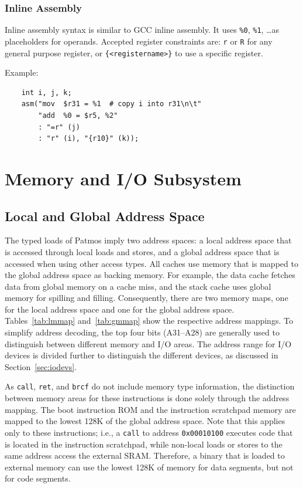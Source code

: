 \documentclass[a4paper,fontsize=10pt,twoside,DIV15,BCOR12mm,headinclude=true,footinclude=false,pagesize,bibtotoc]{scrbook}
\newcommand{\code}[1]{{\texttt{#1}}}
\begin{document}
\subsection{Inline Assembly}

Inline assembly syntax is similar to GCC inline assembly. It uses \texttt{\%0}, \texttt{\%1}, \ldots as placeholders
for operands. Accepted register constraints are: \texttt{r} or \texttt{R} for any general purpose register, or
\texttt{\{<registername>\}} to use a specific register.

Example:
\begin{verbatim}
    int i, j, k;
    asm("mov  $r31 = %1  # copy i into r31\n\t"
        "add  %0 = $r5, %2"
        : "=r" (j)
        : "r" (i), "{r10}" (k));
\end{verbatim}

\chapter{Memory and I/O Subsystem}
\label{chap:memsyst}

\section{Local and Global Address Space}

The typed loads of Patmos imply two address spaces: a local address
space that is accessed through local loads and stores, and a global
address space that is accessed when using other access types. All
caches use memory that is mapped to the global address space as
backing memory. For example, the data cache fetches data from global
memory on a cache miss, and the stack cache uses global memory for
spilling and filling. Consequently, there are two memory maps, one for
the local address space and one for the global address
space. Tables~\ref{tab:lmmap} and~\ref{tab:gmmap} show the respective
address mappings. To simplify address decoding, the top four bits
(A31--A28) are generally used to distinguish between different memory
and I/O areas. The address range for I/O devices is divided further to
distinguish the different devices, as discussed in
Section~\ref{sec:iodevs}.

As \code{call}, \code{ret}, and \code{brcf} do not include memory type
information, the distinction between memory areas for these
instructions is done solely through the address mapping. The boot instruction ROM
and the instruction scratchpad memory are mapped to the lowest 128K of
the global address space. Note that this applies only to these
instructions; i.e., a \code{call} to address \code{0x00010100}
executes code that is located in the instruction scratchpad, while
non-local loads or stores to the same address access the external
SRAM. Therefore, a binary that is loaded to external memory can use
the lowest 128K of memory for data segments, but not for code
segments.
\end{document}

